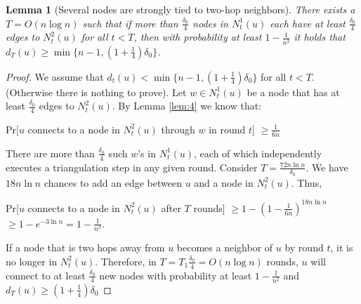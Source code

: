 \documentclass[
10pt, %
a4paper, %
oneside, %
headinclude,footinclude, %
BCOR5mm, %
]{scrartcl}
\newtheorem{lemma}[theorem]{\textbf{Lemma}}
\begin{document}
\begin{lemma}[Several nodes are strongly tied to two-hop neighbors]\label{lem:6}
	There exists a $T = O(n \log n)$ such that if more than $\frac{\delta_0}{4}$ nodes in $N_t^1(u)$ each have at least $\frac{\delta_0}{4}$ edges to $N_t^2(u)$ for all $t < T$, then with probability at least $1 - \frac{1}{n^2}$ it holds that $d_T(u) \geq \min \{n-1, (1+\frac{1}{4})\delta_0 \}$.
\end{lemma}
\begin{proof}
	We assume that $d_t(u) < \min \{n-1, (1+\frac{1}{4})\delta_0 \}$ for all $ t < T$. (Otherwise there is nothing to prove). Let $w \in N_t^1 (u)$ be a node that has at least $\frac{\delta_0}{4}$ edges to $N_t^2(u)$. By Lemma \ref{lem:4} we know that: 
	\begin{center}
		Pr[$u$ connects to a node in $N_t^2(u)$ through $w$ in round $t$] $ \geq \frac{1}{6n}$
	\end{center} 
There are more than $\frac{\delta_0}{4}$ such $w$'s in $N_t^1(u)$, each of which independently executes a triangulation step in any given round. Consider $T = \frac{72n\ln n}{\delta_0}$. We have $18n\ln n$ chances to add an edge between $u$ and a node in $N_t^2(u)$. Thus, 
\begin{center}
	Pr[$u$ connects to a node in $N_t^2(u)$ after $T$ rounds] $\geq
	1 - (1 - \frac{1}{6n})^{18n\ln n}$ \\ $\geq 
	1 - e^{-3\ln n} = 1 - \frac{1}{n^3}$.
\end{center} 
If a node that is two hops away from $u$ becomes a neighbor of $u$ by round $t$, it is no longer in $N_t^2(u)$. Therefore, in $T = T_1\frac{\delta_0}{4} = O(n\log n)$ rounds, $u$ will connect to at least $\frac{\delta_0}{4}$ new nodes with probability at least $1 - \frac{1}{n^2}$ and $d_T(u) \geq (1+\frac{1}{4})\delta_0$
\end{proof}
\end{document}
